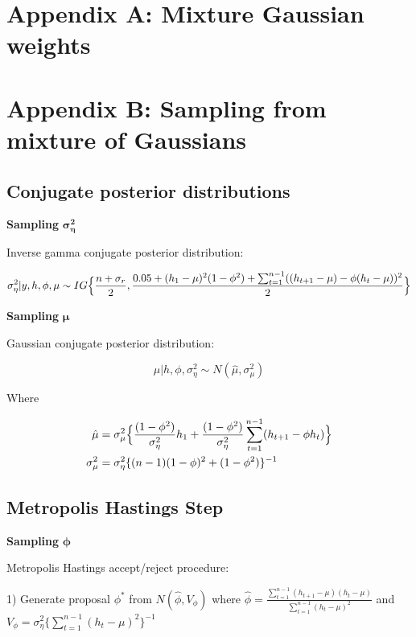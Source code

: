 \documentclass[12pt, a4paper]{article}
\begin{document}
\newpage



\newpage

\section{Appendix A: Mixture Gaussian weights}

\newpage

\section{Appendix B: Sampling from mixture of Gaussians}

\subsection*{Conjugate posterior distributions}

\textbf{Sampling} $\boldsymbol{\sigma_{\eta}^2}$

Inverse gamma conjugate posterior distribution:

$$
\sigma^2_{\eta} | y,h,\phi,\mu \sim IG \Bigl\{\frac{n+\sigma_r}{2}, \frac{0.05 + (h_1 - \mu)^2 (1 - \phi^2) + \sum_{t=1}^{n-1}((h_{t+1} - \mu) - \phi(h_t - \mu))^2}{2}\Bigr\}
$$

\textbf{Sampling}  $\boldsymbol{\mu}$

Gaussian conjugate posterior distribution:

$$
\mu | h,\phi,\sigma^2_{\eta}  \sim N(\hat{\mu}, \sigma^2_{\mu})
$$

Where

$$
\begin{aligned}
\hat{\mu} &= \sigma^2_{\mu} \Bigl\{\frac{(1-\phi^2)}{\sigma_{\eta}^2}h_1 +\frac{(1-\phi^2)}{\sigma_{\eta}^2} \sum_{t=1}^{n-1} (h_{t+1} - \phi h_t)\Bigr\} \\
\sigma^2_{\mu} &= \sigma^2_{\eta} \{(n-1)(1-\phi)^2 + (1-\phi^2)\}^{-1}
\end{aligned}
$$

\subsection*{Metropolis Hastings Step}
\textbf{Sampling}  $\boldsymbol{\phi}$

Metropolis Hastings accept/reject procedure:

1) Generate proposal $\phi^\ast$ from $N(\hat{\phi}, V_{\phi})$ where $\hat{\phi} = \frac{\sum_{t=1}^{n-1} (h_{t+1} - \mu)(h_t - \mu)}{\sum_{t=1}^{n-1} (h_t - \mu)^2}$ and $V_{\phi} = \sigma^2_{\eta} \{\sum_{t=1}^{n-1} (h_t - \mu)^2\}^{-1}$
\end{document}
